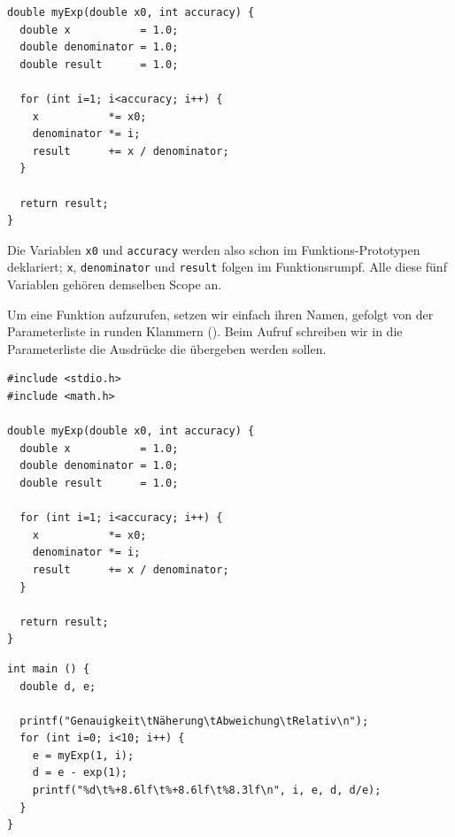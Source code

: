 \begin{codebox}
\begin{verbatim}
double myExp(double x0, int accuracy) {
  double x           = 1.0;
  double denominator = 1.0;
  double result      = 1.0;

  for (int i=1; i<accuracy; i++) {
    x           *= x0;
    denominator *= i;
    result      += x / denominator;
  }

  return result;
}
\end{verbatim}
\end{codebox}

Die Variablen \texttt{x0} und \texttt{accuracy} werden also schon im Funktions-Prototypen deklariert; \texttt{x}, \texttt{denominator} und \texttt{result} folgen im Funktionsrumpf. Alle diese fünf Variablen gehören demselben Scope an.

Um eine Funktion aufzurufen, setzen wir einfach ihren Namen, gefolgt von der Parameterliste in runden Klammern (). Beim Aufruf schreiben wir in die Parameterliste die Ausdrücke die übergeben werden sollen.

\begin{codebox}
\begin{verbatim}
#include <stdio.h>
#include <math.h>

double myExp(double x0, int accuracy) {
  double x           = 1.0;
  double denominator = 1.0;
  double result      = 1.0;

  for (int i=1; i<accuracy; i++) {
    x           *= x0;
    denominator *= i;
    result      += x / denominator;
  }

  return result;
}
\end{verbatim}
\end{codebox}

\begin{codebox}[]
\begin{verbatim}
int main () {
  double d, e;

  printf("Genauigkeit\tNäherung\tAbweichung\tRelativ\n");
  for (int i=0; i<10; i++) {
    e = myExp(1, i);
    d = e - exp(1);
    printf("%d\t%+8.6lf\t%+8.6lf\t%8.3lf\n", i, e, d, d/e);
  }
}
\end{verbatim}
\end{codebox}


